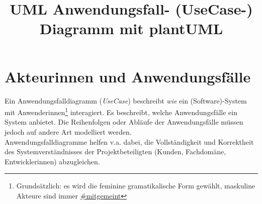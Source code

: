 \documentclass[10pt]{scrartcl}
\title{UML Anwendungsfall- (UseCase-) Diagramm
	 mit plantUML
 }
\begin{document}
	\setlength{\droptitle}{-40pt} %
	\maketitle

	




\setcounter{page}{1}

\section{Akteurinnen und Anwendungsfälle}

Ein Anwendungsfalldiagramm (\textit{UseCase}) beschreibt \textit{wie} ein (Software)-System mit Anwenderinnen\footnote{Grundsätzlich: es wird die feminine gramatikalische Form gewählt, maskuline Akteure sind immer \hyperref{https://twitter.com/hashtag/mitgemeint?lang=de}{}{}{\#mitgemeint}} interagiert. Es beschreibt, welche Anwendungsfälle ein System anbietet. Die Reihenfolgen oder Abläufe der Anwendungsfälle müssen jedoch auf andere Art modelliert werden. \\ 
Anwendungsfalldiagramme helfen v.a. dabei, die Vollständigkeit und Korrektheit des Systemverständnisses der Projektbeteiligten (Kunden, Fachdomäne, Entwicklerinnen) abzugleichen.
\end{document}
